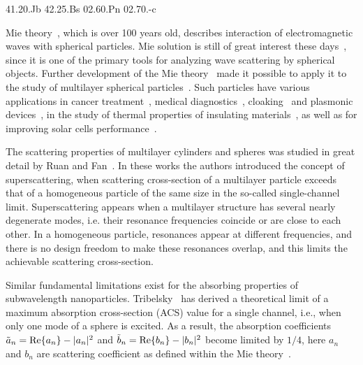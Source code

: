 \documentclass[aps,prl,twocolumn,showpacs,superscriptaddress,groupedaddress]{revtex4-1}
\begin{document}
\pacs%
{41.20.Jb 42.25.Bs 02.60.Pn 02.70.-c}

\maketitle %

Mie theory~\cite{Mie-1908}, which is over 100 years old, describes
interaction of electromagnetic waves with spherical particles. Mie
solution is still of great interest these
days~\cite{Suzuki-2008,MacKowski-2012,Lerme-2000,Xu-2005,Li-2006,Gogoi-2010,Santiago-2011},
since it is one of the primary tools for analyzing wave scattering by
spherical objects. Further development of the Mie
theory~\cite{Yang-2003, Pena-scattnlay-2009} made it possible to apply
it to the study of multilayer spherical
particles~\cite{Sheehan-2013,Selmke-2012}.  Such particles have
various applications in cancer treatment~\cite{Zhang-2010,
  Hirsch-2003}, medical diagnostics~\cite{Allain-2002},
cloaking~\cite{Qui-2009, Semouchkina-2013, Ladutenko-2014} and
plasmonic devices~\cite{Martin-2013, Alu-2005}, in the study of
thermal properties of insulating materials~\cite{Xie-2013}, as well as
for improving solar cells performance~\cite{Kameya-2011,Mann-2011}.

The scattering properties of multilayer cylinders and spheres was
studied in great detail by Ruan and Fan~\cite{Fan-2010,Fan-2011}.  In
these works the authors introduced the concept of superscattering,
when scattering cross-section of a multilayer particle exceeds that of
a homogeneous particle of the same size in the so-called
single-channel limit. Superscattering appears when a multilayer
structure has several nearly degenerate modes, i.e. their resonance
frequencies coincide or are close to each other. In a homogeneous
particle, resonances appear at different frequencies, and there is no
design freedom to make these resonances overlap, and this limits the
achievable scattering cross-section.

Similar fundamental limitations exist for the absorbing properties of
subwavelength nanoparticles.  Tribelsky~\cite{Tribelsky-2011} has
derived a theoretical limit of a maximum absorption cross-section
(ACS) value for a single channel, i.e., when only one mode of a sphere
is excited.  As a result, the absorption coefficients $\tilde{a}_n=
{\rm Re}\{a_n\} - |a_n|^2 $ and $\tilde{b}_n= {\rm Re}\{b_n\} -
|b_n|^2 $ become limited by $1/4$, here $a_n$ and $b_n$ are scattering
coefficient as defined within the Mie theory~\cite{Bohren-1983}.
\end{document}

